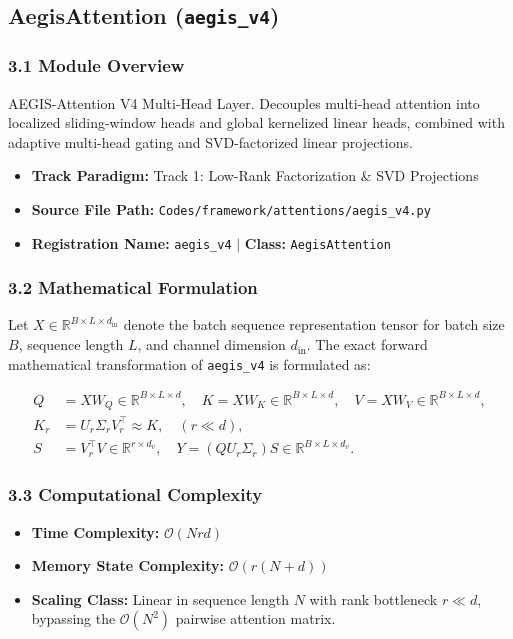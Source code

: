 \subsection{AegisAttention (\texttt{aegis\_v4})}
\label{sec:app_module_aegis_v4}

\subsubsection*{3.1 Module Overview}
AEGIS-Attention V4 Multi-Head Layer. Decouples multi-head attention into localized sliding-window heads and global kernelized linear heads, combined with adaptive multi-head gating and SVD-factorized linear projections.
\begin{itemize}
    \item \textbf{Track Paradigm:} Track 1: Low-Rank Factorization \& SVD Projections
    \item \textbf{Source File Path:} \texttt{Codes/framework/attentions/aegis\_v4.py}
    \item \textbf{Registration Name:} \texttt{aegis\_v4} $\mid$ \textbf{Class:} \texttt{AegisAttention}
\end{itemize}

\subsubsection*{3.2 Mathematical Formulation}
Let $X \in \mathbb{R}^{B \times L \times d_{\text{in}}}$ denote the batch sequence representation tensor for batch size $B$, sequence length $L$, and channel dimension $d_{\text{in}}$. The exact forward mathematical transformation of \texttt{aegis\_v4} is formulated as:

\begin{align}
Q &= X W_Q \in \mathbb{R}^{B \times L \times d}, \quad K = X W_K \in \mathbb{R}^{B \times L \times d}, \quad V = X W_V \in \mathbb{R}^{B \times L \times d}, \\
K_r &= U_r \Sigma_r V_r^\top \approx K, \quad (r \ll d), \\
S &= V_r^\top V \in \mathbb{R}^{r \times d_v}, \quad Y = (Q U_r \Sigma_r) S \in \mathbb{R}^{B \times L \times d_v}.
\end{align}


\subsubsection*{3.3 Computational Complexity}
\begin{itemize}
    \item \textbf{Time Complexity:} $\mathcal{O}(N r d)$
    \item \textbf{Memory State Complexity:} $\mathcal{O}(r(N + d))$
    \item \textbf{Scaling Class:} Linear in sequence length $N$ with rank bottleneck $r \ll d$, bypassing the $\mathcal{O}(N^2)$ pairwise attention matrix.
\end{itemize}

